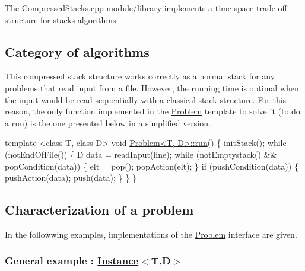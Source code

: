 The Compressed\+Stacks.\+cpp module/library implements a time-\/space trade-\/off structure for stack\textquotesingle{}s algorithms.

\subsection*{Category of algorithms}

This compressed stack structure works correctly as a normal stack for any problems that read input from a file. However, the running time is optimal when the input would be read sequentially with a classical stack structure. For this reason, the only function implemented in the \hyperlink{class_problem}{Problem} template to solve it (to do a run) is the one presented below in a simplified version. 


\begin{DoxyCode}
\textcolor{keyword}{template} <\textcolor{keyword}{class} T, \textcolor{keyword}{class} D> \textcolor{keywordtype}{void} \hyperlink{class_problem}{Problem<T, D>::run}() \{
  initStack();
  \textcolor{keywordflow}{while} (notEndOfFile()) \{
    D data = readInput(line);
    \textcolor{keywordflow}{while} (notEmptystack() && popCondition(data)) \{
      elt = pop();
      popAction(elt);
    \}
    \textcolor{keywordflow}{if} (pushCondition(data)) \{
      pushAction(data);
      push(data);
    \}
  \}
\}
\end{DoxyCode}


\subsection*{Characterization of a problem}

In the followwing examples, implementations of the \hyperlink{class_problem}{Problem} interface are given.

\subsubsection*{General example \+: {\ttfamily \hyperlink{class_instance}{Instance}$<$T,D$>$}}


